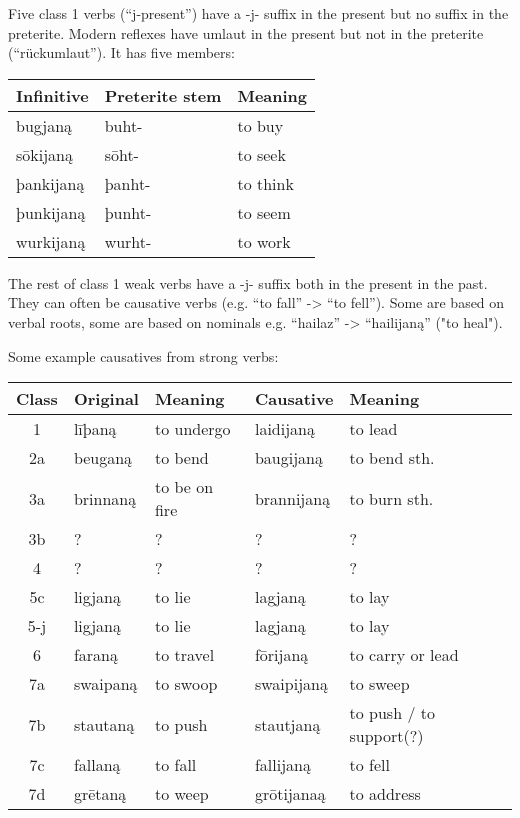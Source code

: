 \documentclass{article}
\begin{document}
Five class 1 verbs (``j-present'') have a -j- suffix in the present but no suffix in the preterite. Modern reflexes have umlaut in the present but not in the preterite (``rückumlaut''). It has five members:

\begin{center}
\begin{tabular}{ | l l l |}
\hline
Infinitive & Preterite stem &  Meaning \\
\hline
bugjaną   & buht-  & to buy \\
sōkijaną  & sōht-  & to seek \\
þankijaną & þanht- & to think \\
þunkijaną & þunht- & to seem \\
wurkijaną & wurht- & to work \\
\hline
\end{tabular}
\end{center}

The rest of class 1 weak verbs have a -j- suffix both in the present in the past. They can often be causative verbs (e.g. ``to fall'' -> ``to fell''). Some are based on verbal roots, some are based on nominals e.g. ``hailaz'' -> ``hailijaną'' ("to heal").

Some example causatives from strong verbs:

\begin{center}
\begin{tabular}{| c l l l l |}
\hline
Class & Original & Meaning & Causative & Meaning \\
\hline

1   & līþaną   & to undergo     & laidijaną  & to lead \\
2a  & beuganą  & to bend        & baugijaną  & to bend sth. \\
3a  & brinnaną & to be on fire  & brannijaną & to burn sth. \\
3b  & ?        & ?              & ?          & ? \\
4   & ?        & ?              & ?          & ? \\
5c  & ligjaną  & to lie         & lagjaną    & to lay \\
5-j & ligjaną  & to lie         & lagjaną    & to lay \\
6   & faraną   & to travel      & fōrijaną   & to carry or lead \\
7a  & swaipaną & to swoop       & swaipijaną & to sweep \\
7b  & stautaną & to push        & stautjaną  & to push / to support(?) \\
7c  & fallaną  & to fall        & fallijaną  & to fell \\
7d  & grētaną  & to weep        & grōtijanaą & to address \\
\hline
\end{tabular}
\end{center}
\end{document}

